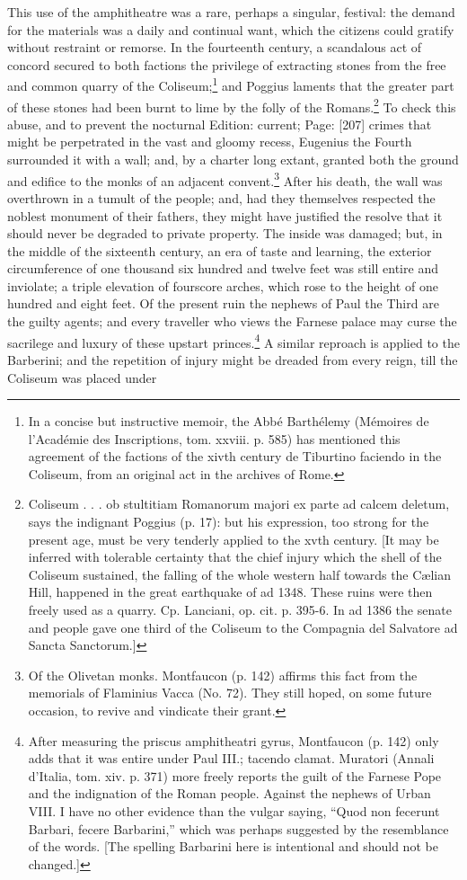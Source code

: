 This use of the amphitheatre was a rare, perhaps a singular, festival: the demand for the materials was a daily and continual want, which the citizens could gratify without restraint or remorse. In the fourteenth century, a scandalous act of concord secured to both factions the privilege of extracting stones from the free and common quarry of the Coliseum;\footnote{In a concise but instructive memoir, the Abbé Barthélemy (Mémoires de l\texthebrew{}’Académie des Inscriptions, tom. xxviii. p. 585) has mentioned this agreement of the factions of the xivth century de Tiburtino faciendo in the Coliseum, from an original act in the archives of Rome.} and Poggius laments that the greater part of these stones had been burnt to lime by the folly of the Romans.\footnote{Coliseum . . . ob stultitiam Romanorum majori ex parte ad calcem deletum, says the indignant Poggius (p. 17): but his expression, too strong for the present age, must be very tenderly applied to the xvth century. [It may be inferred with tolerable certainty that the chief injury which the shell of the Coliseum sustained, the falling of the whole western half towards the Cælian Hill, happened in the great earthquake of ad 1348. These ruins were then freely used as a quarry. Cp. Lanciani, op. cit. p. 395-6. In ad 1386 the senate and people gave one third of the Coliseum to the Compagnia del Salvatore ad Sancta Sanctorum.]} To check this abuse, and to prevent the nocturnal Edition: current; Page: [207] crimes that might be perpetrated in the vast and gloomy recess, Eugenius the Fourth surrounded it with a wall; and, by a charter long extant, granted both the ground and edifice to the monks of an adjacent convent.\footnote{Of the Olivetan monks. Montfaucon (p. 142) affirms this fact from the memorials of Flaminius Vacca (No. 72). They still hoped, on some future occasion, to revive and vindicate their grant.} After his death, the wall was overthrown in a tumult of the people; and, had they themselves respected the noblest monument of their fathers, they might have justified the resolve that it should never be degraded to private property. The inside was damaged; but, in the middle of the sixteenth century, an era of taste and learning, the exterior circumference of one thousand six hundred and twelve feet was still entire and inviolate; a triple elevation of fourscore arches, which rose to the height of one hundred and eight feet. Of the present ruin the nephews of Paul the Third are the guilty agents; and every traveller who views the Farnese palace may curse the sacrilege and luxury of these upstart princes.\footnote{After measuring the priscus amphitheatri gyrus, Montfaucon (p. 142) only adds that it was entire under Paul III.; tacendo clamat. Muratori (Annali d\texthebrew{}’Italia, tom. xiv. p. 371) more freely reports the guilt of the Farnese Pope and the indignation of the Roman people. Against the nephews of Urban VIII. I have no other evidence than the vulgar saying, \texthebrew{“}Quod non fecerunt Barbari, fecere Barbarini,\texthebrew{}” which was perhaps suggested by the resemblance of the words. [The spelling Barbarini here is intentional and should not be changed.]} A similar reproach is applied to the Barberini; and the repetition of injury might be dreaded from every reign, till the Coliseum was placed under 